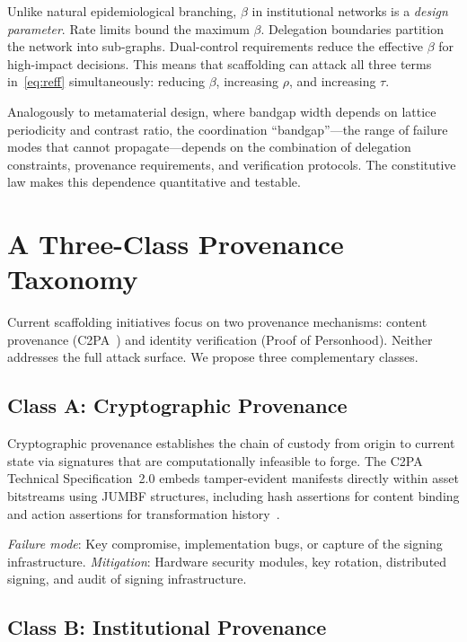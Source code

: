 \documentclass[runningheads]{llncs}
\begin{document}
Unlike natural epidemiological branching, $\beta$ in institutional networks is a \emph{design parameter}. Rate limits bound the maximum $\beta$. Delegation boundaries partition the network into sub-graphs. Dual-control requirements reduce the effective $\beta$ for high-impact decisions. This means that scaffolding can attack all three terms in~\eqref{eq:reff} simultaneously: reducing $\beta$, increasing $\rho$, and increasing $\tau$.

Analogously to metamaterial design, where bandgap width depends on lattice periodicity and contrast ratio, the coordination ``bandgap''---the range of failure modes that cannot propagate---depends on the combination of delegation constraints, provenance requirements, and verification protocols. The constitutive law makes this dependence quantitative and testable.


\section{A Three-Class Provenance Taxonomy}
\label{sec:provenance}

Current scaffolding initiatives focus on two provenance mechanisms: content provenance (C2PA~\cite{c2pa2024}) and identity verification (Proof of Personhood). Neither addresses the full attack surface. We propose three complementary classes.

\subsection{Class A: Cryptographic Provenance}

Cryptographic provenance establishes the chain of custody from origin to current state via signatures that are computationally infeasible to forge. The C2PA Technical Specification~2.0 embeds tamper-evident manifests directly within asset bitstreams using JUMBF structures, including hash assertions for content binding and action assertions for transformation history~\cite{c2pa2024}.

\emph{Failure mode}: Key compromise, implementation bugs, or capture of the signing infrastructure. \emph{Mitigation}: Hardware security modules, key rotation, distributed signing, and audit of signing infrastructure.

\subsection{Class B: Institutional Provenance}
\end{document}
